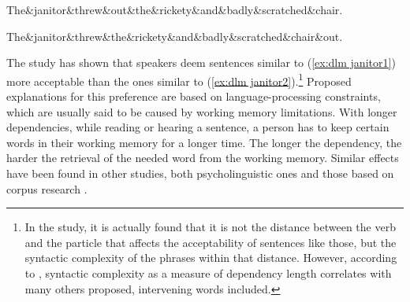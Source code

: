 \begin{exe}
    \ex\label{ex:dlm janitor}
    \begin{xlist}
    \ex\label{ex:dlm janitor1}
    \begin{dependency}[theme = simple, segmented edge, baseline=-\the\dimexpr\fontdimen22\textfont2\relax]
        \begin{deptext}
        The\&janitor\&threw\&out\&the\&rickety\&and\&badly\&scratched\&chair.\\
        \end{deptext}
    \end{dependency}

    \ex\label{ex:dlm janitor2}
    \begin{dependency}[theme = simple, segmented edge, edge height = 4ex, baseline=-\the\dimexpr\fontdimen22\textfont2\relax]
        \begin{deptext}
        The\&janitor\&threw\&the\&rickety\&and\&badly\&scratched\&chair\&out.\\
        \end{deptext}
    \end{dependency}
    \end{xlist}
\end{exe}

The study has shown that speakers deem sentences similar to (\ref{ex:dlm janitor1}) more acceptable than the ones similar to (\ref{ex:dlm janitor2}).\footnote{In the study, it is actually found that it is not the distance between the verb and the particle that affects the acceptability of sentences like those, but the syntactic complexity of the phrases within that distance. However, according to \cite{wasow2002postverbal}, syntactic complexity as a measure of dependency length correlates with many others proposed, intervening words included.} Proposed explanations for this preference are based on language-processing constraints, which are usually said to be caused by working memory limitations. With longer dependencies, while reading or hearing a sentence, a person has to keep certain words in their working memory for a longer time. The longer the dependency, the harder the retrieval of the needed word from the working memory. Similar effects have been found in other studies, both psycholinguistic ones \citep{KING1991580, GIBSON19981} and those based on corpus research \citep{gildea-temperley-2007-optimizing, gildea-temperley-2010, dyer-2023}. 

